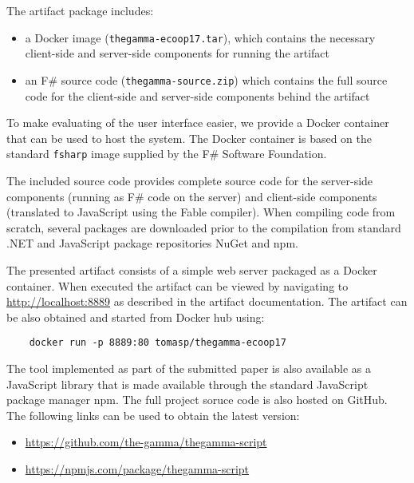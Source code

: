 \documentclass[a4paper,UKenglish]{darts}
\begin{document}
\begin{content}
The artifact package includes:
\begin{itemize}
\item a Docker image ({\tt thegamma-ecoop17.tar}), which contains the necessary client-side
  and server-side components for running the artifact
\item an F\# source code ({\tt thegamma-source.zip}) which contains the full source code for 
  the client-side and server-side components behind the artifact
\end{itemize}
To make evaluating of the user interface easier, we provide a Docker container that
can be used to host the system. The Docker container is based on the standard {\tt fsharp} 
image supplied by the F\# Software Foundation. 

The included source code provides complete source code
for the server-side components (running as F\# code on the server) and client-side components
(translated to JavaScript using the Fable compiler). When compiling code from scratch, several
packages are downloaded prior to the compilation from standard .NET and JavaScript package
repositories NuGet and npm.
\end{content} 

\begin{getting}

The presented artifact consists of a simple web server packaged as a Docker container. When
executed the artifact can be viewed by navigating to \url{http://localhost:8889} as described
in the artifact documentation. The artifact can be also obtained and started from
Docker hub using:

\begin{verbatim}
    docker run -p 8889:80 tomasp/thegamma-ecoop17
\end{verbatim}

\noindent
The tool implemented as part of the submitted paper is also available as a JavaScript library
that is made available through the standard JavaScript package manager npm. The full
project soruce code is also hosted on GitHub. The following links can be used to obtain the latest
version:
\begin{itemize}
  \item \url{https://github.com/the-gamma/thegamma-script}
  \item \url{https://npmjs.com/package/thegamma-script}
\end{itemize}

\end{getting} 
\end{document}
